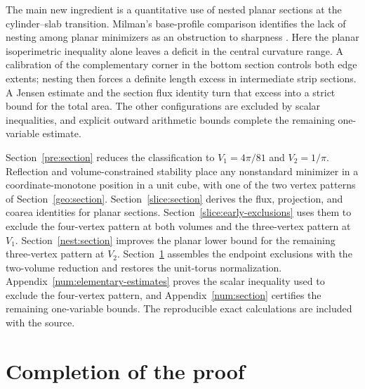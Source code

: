 \documentclass[11pt]{article}
\theoremstyle{remark}
\numberwithin{equation}{section}
\begin{document}
The main new ingredient is a quantitative use of nested planar
sections at the cylinder--slab transition. Milman's base-profile
comparison identifies the lack of nesting among planar minimizers as
an obstruction to sharpness \cite[Corollary~2.8 and the surrounding
discussion]{Milman}. Here the planar isoperimetric inequality alone
leaves a deficit in the central curvature range. A calibration of the
complementary corner in the bottom section controls both edge extents;
nesting then forces a definite length excess in intermediate strip
sections. A Jensen estimate and the section flux identity turn that
excess into a strict bound for the total area. The other configurations
are excluded by scalar inequalities, and explicit outward arithmetic
bounds complete the remaining one-variable estimate.

Section~\ref{pre:section} reduces the classification to
\(V_1=4\pi/81\) and \(V_2=1/\pi\).
Reflection and volume-constrained stability place any nonstandard
minimizer in a coordinate-monotone position in a unit cube, with one of
the two vertex patterns of Section~\ref{geo:section}.
Section~\ref{slice:section} derives the flux, projection, and coarea
identities for planar sections. Section~\ref{slice:early-exclusions} uses them to
exclude the four-vertex pattern at both volumes and the three-vertex
pattern at \(V_1\).
Section~\ref{nest:section} improves the planar lower bound for the
remaining three-vertex pattern at \(V_2\).
Section~\ref{completion:section} assembles the endpoint exclusions with
the two-volume reduction and restores the unit-torus normalization.
Appendix~\ref{num:elementary-estimates} proves the scalar inequality
used to exclude the four-vertex pattern, and Appendix~\ref{num:section}
certifies the remaining one-variable bounds.
The reproducible exact calculations are included with the source.







\section{Completion of the proof}
\label{completion:section}
\end{document}
